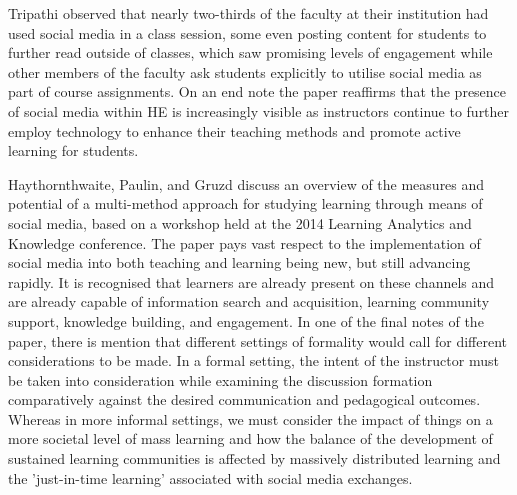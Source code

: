 \documentclass[lettersize,journal]{IEEEtran}
\begin{document}
    Tripathi \cite{Tripathi 2022} observed that nearly two-thirds of the faculty at
    their institution had used social media in a class session, some even
    posting content for students to further read outside of classes, which saw
    promising levels of engagement while other members of the faculty ask students
    explicitly to utilise social media as part of course assignments. On an end
    note the paper reaffirms that the presence of social media within HE is
    increasingly visible as instructors continue to further employ technology
    to enhance their teaching methods and promote active learning for students.

    Haythornthwaite, Paulin, and Gruzd \cite{Haythornthwaite et al 2016} discuss
    an overview of the measures and potential of a multi-method approach for studying learning
    through means of social media, based on a workshop held at the 2014 Learning
    Analytics and Knowledge conference. The paper pays vast respect to the
    implementation of social media into both teaching and learning being new,
    but still advancing rapidly. It is recognised that learners are already
    present on these channels and are already capable of information search and
    acquisition, learning community support, knowledge building, and engagement.
    In one of the final notes of the paper, there is mention that different
    settings of formality would call for different considerations to be made. In
    a formal setting, the intent of the instructor must be taken into
    consideration while examining the discussion formation comparatively against
    the desired communication and pedagogical outcomes. Whereas in more informal
    settings, we must consider the impact of things on a more societal level of
    mass learning and how the balance of the development of sustained learning
    communities is affected by massively distributed learning and the
    'just-in-time learning' associated with social media exchanges.
\end{document}
